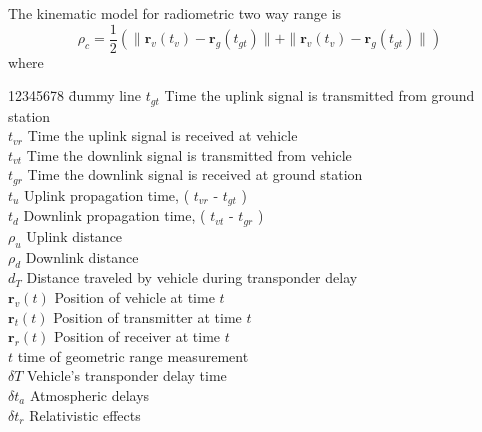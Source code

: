 The kinematic model for radiometric two way range is
%
\begin{equation}
     \rho_c= \frac{1}{2}\left(\| \mathbf{r}_v(t_{v}) -  \mathbf{r}_g(t_{gt})  \| +
      \| \mathbf{r}_v(t_{v}) -  \mathbf{r}_g(t_{gt})  \|\right) \label{Eq:ExpectedTwoWayRange}
\end{equation}
%
where
%
\begin{tabbing}[htbp!]
12345678 \= dummy line \kill
$t_{gt}$ \> Time the uplink signal is transmitted from ground station\\
$t_{vr}$ \> Time the uplink signal is received at vehicle\\
$t_{vt}$ \> Time the downlink signal is transmitted from vehicle\\
$t_{gr}$ \> Time the downlink signal is received at ground station\\
$t_u$    \> Uplink propagation time, ( $t_{vr}$ - $t_{gt}$ )\\
$t_d$    \> Downlink propagation time, ( $t_{vt}$ - $t_{gr}$ )\\
$\rho_u$    \> Uplink distance\\
$\rho_d$    \> Downlink distance\\
$d_T$     \> Distance traveled by vehicle during transponder delay\\
$\mathbf{r}_v(t)$ \> Position of vehicle at time $t$\\
$\mathbf{r}_t(t)$ \> Position of transmitter at time $t$\\
$\mathbf{r}_r(t)$ \> Position of receiver at time $t$\\
$t$           \>  time of geometric range measurement \\
$\delta T$  \>  Vehicle's transponder delay time\\
$\delta t_a$  \>  Atmospheric delays\\
$\delta t_r$  \>  Relativistic effects\\
\end{tabbing}
%


